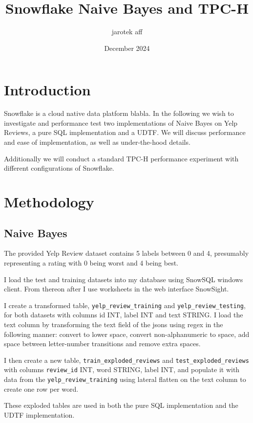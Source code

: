 \documentclass{article}
\title{Snowflake Naive Bayes and TPC-H}
\author{jarotek aff}
\date{December 2024}
\begin{document}
\maketitle

\section{Introduction}
Snowflake\cite{snowflake_2016} is a cloud native data platform blabla. 
In the following we wish to investigate and performance test two implementations of Naive Bayes on Yelp Reviews, a pure SQL implementation and a UDTF. We will discuss performance and ease of implementation, as well as under-the-hood details. 

\bigskip
Additionally we will conduct a standard TPC-H performance experiment with different configurations of Snowflake. 

\section{Methodology}

\subsection{Naive Bayes}
The provided Yelp Review dataset contains 5 labels between 0 and 4, presumably representing a rating with 0 being worst and 4 being best. 

\medskip \noindent I load the test and training datasets into my database using SnowSQL windows client. From thereon after I use worksheets in the web interface SnowSight. 

\medskip \noindent I create a transformed table, \texttt{yelp\_review\_training} and \texttt{yelp\_review\_testing}, for both datasets with columns id INT, label INT and text STRING. I load the text column by transforming the text field of the jsons using regex in the following manner: convert to lower space, convert non-alphanumeric to space, add space between letter-number transitions and remove extra spaces. 

\medskip \noindent I then create a new table, \texttt{train\_exploded\_reviews} and \texttt{test\_exploded\_reviews} with columns \texttt{review\_id} INT, word STRING, label INT, and populate it with data from the \texttt{yelp\_review\_training} using lateral flatten on the text column to create one row per word. 

\medskip \noindent These exploded tables are used in both the pure SQL implementation and the UDTF implementation. 
\end{document}
